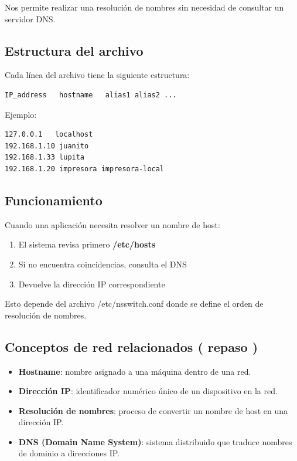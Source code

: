 \documentclass[11pt, letterpaper]{article}
\begin{document}
Nos permite realizar una resolución de nombres sin necesidad de consultar un servidor DNS.
\subsection{Estructura del archivo}
\label{sec:orgbf3cd88}

Cada línea del archivo tiene la siguiente estructura:

\begin{verbatim}
IP_address   hostname   alias1 alias2 ...
\end{verbatim}

Ejemplo:

\begin{verbatim}
127.0.0.1   localhost
192.168.1.10 juanito 
192.168.1.33 lupita 
192.168.1.20 impresora impresora-local
\end{verbatim}
\subsection{Funcionamiento}
\label{sec:org4022d38}

Cuando una aplicación necesita resolver un nombre de host:

\begin{enumerate}
\item El sistema revisa primero \textbf{/etc/hosts}
\item Si no encuentra coincidencias, consulta el DNS
\item Devuelve la dirección IP correspondiente
\end{enumerate}

Esto depende del archivo /etc/nsswitch.conf donde se define el orden de resolución de nombres.
\subsection{Conceptos de red relacionados ( repaso )}
\label{sec:orgef04ed7}

\begin{itemize}
\item \textbf{Hostname}: nombre asignado a una máquina dentro de una red.
\item \textbf{Dirección IP}: identificador numérico único de un dispositivo en la red.
\item \textbf{Resolución de nombres}: proceso de convertir un nombre de host en una dirección IP.
\item \textbf{DNS (Domain Name System)}: sistema distribuido que traduce nombres de dominio a direcciones IP.
\end{itemize}
\end{document}

